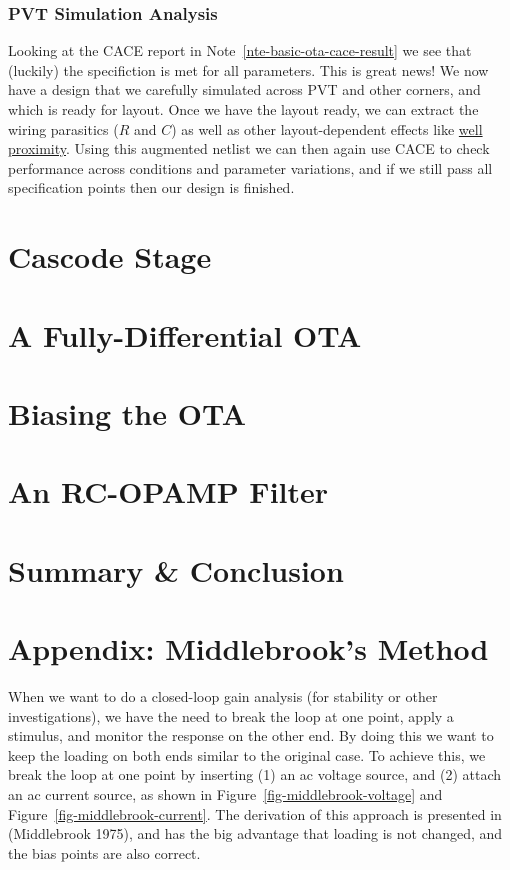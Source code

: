 \documentclass[
  a4paper,
  DIV=11,
  numbers=noendperiod]{scrartcl}
\begin{document}
\subsubsection{PVT Simulation Analysis}\label{pvt-simulation-analysis}

Looking at the CACE report in Note~\ref{nte-basic-ota-cace-result} we
see that (luckily) the specifiction is met for all parameters. This is
great news! We now have a design that we carefully simulated across PVT
and other corners, and which is ready for layout. Once we have the
layout ready, we can extract the wiring parasitics (\(R\) and \(C\)) as
well as other layout-dependent effects like
\href{https://global.oup.com/us/companion.websites/9780195170153/pdf/proximityeffectmodels.pdf}{well
proximity}. Using this augmented netlist we can then again use CACE to
check performance across conditions and parameter variations, and if we
still pass all specification points then our design is finished.

\section{Cascode Stage}\label{cascode-stage}

\section{A Fully-Differential OTA}\label{a-fully-differential-ota}

\section{Biasing the OTA}\label{biasing-the-ota}

\section{An RC-OPAMP Filter}\label{an-rc-opamp-filter}

\section{Summary \& Conclusion}\label{summary-conclusion}

\section{Appendix: Middlebrook's Method}\label{sec-middlebrook-method}

When we want to do a closed-loop gain analysis (for stability or other
investigations), we have the need to break the loop at one point, apply
a stimulus, and monitor the response on the other end. By doing this we
want to keep the loading on both ends similar to the original case. To
achieve this, we break the loop at one point by inserting (1) an ac
voltage source, and (2) attach an ac current source, as shown in
Figure~\ref{fig-middlebrook-voltage} and
Figure~\ref{fig-middlebrook-current}. The derivation of this approach is
presented in (Middlebrook 1975), and has the big advantage that loading
is not changed, and the bias points are also correct.
\end{document}
